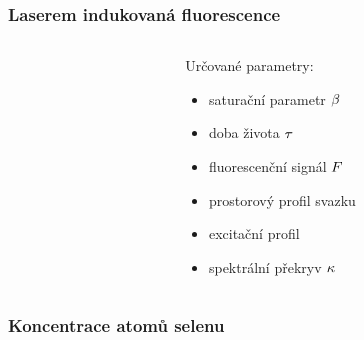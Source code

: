 \documentclass[10pt]{beamer}
\begin{document}
\begin{frame}
	\frametitle{Laserem indukovaná fluorescence}
	\small
	\begin{columns}
	\begin{column}{0.5\textwidth}
		
		
	\end{column}
	\begin{column}{0.5\textwidth}
		Určované parametry:
		\begin{itemize}
			\item saturační parametr $\beta$
			\item doba života $\tau$
			\item fluorescenční signál $F$
			\item prostorový profil svazku
			\item excitační profil
			\item spektrální překryv $\kappa$
		\end{itemize}
	\end{column}
	\end{columns}
\end{frame}

\begin{frame}
	\frametitle{Koncentrace atomů selenu}
	\begin{columns}
	\begin{column}{0.5\textwidth}
		\centering
		\resizebox{\textwidth}{!}{
			
		}
	\end{column}
	\begin{column}{0.5\textwidth}
		\centering
		\resizebox{\textwidth}{!}{
			
		}
	\end{column}
	\end{columns}
\end{frame}

\section*{}
\end{document}
